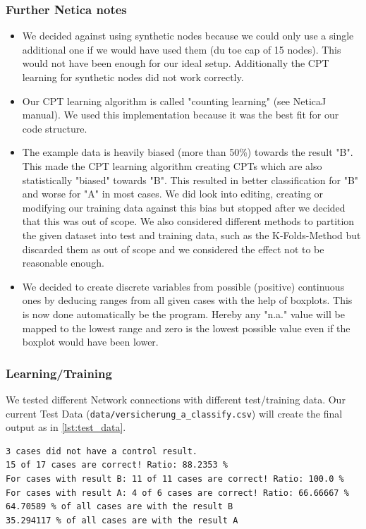 \documentclass[12pt]{scrartcl}
\begin{document}
\subsubsection{Further Netica notes}
\begin{itemize}
    \item We decided against using synthetic nodes because we could only use a single additional one if we would have used them (du toe cap of 15 nodes). This would not have been enough for our ideal setup. Additionally the CPT learning for synthetic nodes did not work correctly.
    \item Our CPT learning algorithm is called "counting learning" (see NeticaJ manual). We used this implementation because it was the best fit for our code structure.
    \item The example data is heavily biased (more than 50\%) towards the result "B". This made the CPT learning algorithm creating CPTs which are also statistically "biased" towards "B". This resulted in better classification for "B" and worse for "A" in most cases. We did look into editing, creating or modifying our training data against this bias but stopped after we decided that this was out of scope. We also considered different methods to partition the given dataset into test and training data, such as the K-Folds-Method but discarded them as out of scope and we considered the effect not to be reasonable enough.
    \item We decided to create discrete variables from possible (positive) continuous ones by deducing ranges from all given cases with the help of boxplots. This is now done automatically be the program. Hereby any "n.a." value will be mapped to the lowest range and zero is the lowest possible value even if the boxplot would have been lower.
\end{itemize}



\subsubsection{Learning/Training}
We tested different Network connections with different test/training data. Our current Test Data (\texttt{data/versicherung_a_classify.csv}) will create the final output as in \autoref{lst:test_data}.


\begin{lstlisting}[breaklines, caption={Output of a program execution with given test data},label={lst:test_data}]
3 cases did not have a control result.
15 of 17 cases are correct! Ratio: 88.2353 %
For cases with result B: 11 of 11 cases are correct! Ratio: 100.0 %
For cases with result A: 4 of 6 cases are correct! Ratio: 66.66667 %
64.70589 % of all cases are with the result B
35.294117 % of all cases are with the result A
\end{lstlisting}
\end{document}
